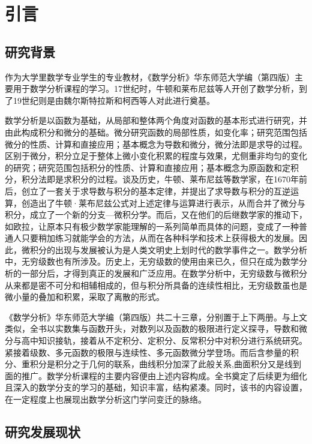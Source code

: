 \chapter{引言}

\section{研究背景}

作为大学里数学专业学生的专业教材，《数学分析》华东师范大学编（第四版）主要用于数学分析课程的学习。17世纪时，牛顿和莱布尼兹等人开创了数学分析，到了19世纪则是由魏尔斯特拉斯和柯西等人对此进行奠基。

数学分析是以函数为基础，从局部和整体两个角度对函数的基本形式进行研究，并由此构成积分和微分的基础。微分研究函数的局部性质，如变化率；研究范围包括微分的性质、计算和直接应用；基本概念为导数和微分，微分法即是求导的过程。区别于微分，积分立足于整体上微小变化积累的程度与效果，尤侧重非均匀的变化的研究；研究范围包括积分的性质、计算和直接应用；基本概念为原函数和定积分，积分法即是求积分的过程。谈及历史，牛顿、莱布尼兹等数学家，在1670年前后，创立了一套关于求导数与积分的基本定律，并提出了求导数与积分的互逆运算，创造出了牛顿·莱布尼兹公式对上述定律与运算进行表示，从而合并了微分与积分，成立了一个新的分支—微积分学。而后，又在他们的后继数学家的推动下，如欧拉，让原本只有极少数学家能理解的一系列简单而具体的问题，变成了一种普通人只要稍加练习就能学会的方法，从而在各种科学和技术上获得极大的发展。因此，微积分的出现与发展被认为是人类文明史上划时代的数学事件之一。数学分析中，无穷级数也有所涉及。历史上，无穷级数的使用由来已久，但只在成为数学分析的一部分后，才得到真正的发展和广泛应用。在数学分析中，无穷级数与微积分从来都是密不可分和相辅相成的，但与积分所具备的连续性相比，无穷级数虽也是微小量的叠加和积累，采取了离散的形式。

《数学分析》华东师范大学编（第四版）共二十三章，分别置于上下两册。与上文类似，全书以实数集与函数开头，对数列以及函数的极限进行定义探寻，导数和微分与高中知识接轨，接着从不定积分、定积分、反常积分中对积分进行系统研究。紧接着级数、多元函数的极限与连续性、多元函数微分学登场。而后含参量的积分、重积分是积分之于几何的联系，曲线积分加深了此般关系,曲面积分又是线到面的推广。数学分析课程的主要内容便由上述内容构成。全书奠定了后续更为细化且深入的数学分支的学习的基础，知识丰富，结构紧凑。同时，该书的内容设置，在一定程度上也展现出数学分析这门学问变迁的脉络。



\section{研究发展现状}


